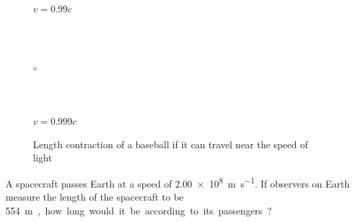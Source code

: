 \begin{figure}[ht]
\begin{minipage}{1in}
    $v=0.99c$
  \end{minipage}
  \begin{minipage}{1in}
    \centering
    \includegraphics[height=1.3in,width=0.06in]{specialRelativity/baseball}\\
    $v=0.999c$
  \end{minipage}
  \caption{Length contraction of a baseball if it can travel near the speed of
    light}
  \label{fig:baseball}
\end{figure}


\begin{example}
  A spacecraft passes Earth at a speed of \SI{2.00e8}{\metre\per\second}. If
  observers on Earth measure the length of the spacecraft to be \SI{554}\metre,
  how long would it be according to its passengers?
\end{example}



%
%
%
%
%

%
%
%
%



